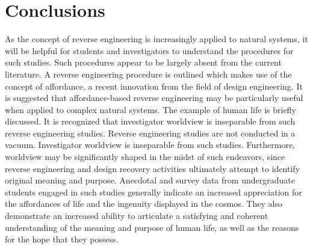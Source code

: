 \section{Conclusions}

As the concept of reverse engineering is increasingly applied to natural
systems, it will be helpful for students and investigators to
understand the procedures for such studies. Such procedures appear to
be largely absent from the current literature. A reverse engineering
procedure is outlined which makes use of the concept of affordance, a
recent innovation from the field of design engineering. It is suggested
that affordance-based reverse engineering may be particularly useful
when applied to complex natural systems. The example of human life is
briefly discussed. It is recognized that investigator worldview is
inseparable from such reverse engineering studies. Reverse engineering
studies are not conducted in a vacuum. Investigator worldview is
inseparable from such studies. Furthermore, worldview may be
significantly shaped in the midst of such endeavors, since reverse
engineering and design recovery activities ultimately attempt to
identify original meaning and purpose. Anecdotal and survey data from
undergraduate students engaged in such studies generally indicate an
increased appreciation for the affordances of life and the ingenuity
displayed in the cosmos. They also demonstrate an increased ability to
articulate a satisfying and coherent understanding of the meaning and
purpose of human life, as well as the reasons for the hope that they
possess.


